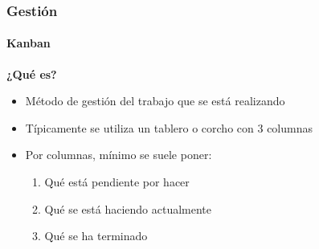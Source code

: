 \begin{frame}
	\frametitle{Gesti\'on}
	\framesubtitle{Kanban}
	
	\textbf{¿Qu\'e es?}
	\begin{itemize}
		\item M\'etodo de gesti\'on del trabajo que se est\'a realizando
		\item T\'ipicamente se utiliza un tablero o corcho con 3 columnas
		\item Por columnas, m\'inimo se suele poner:
		\begin{enumerate}
			\item Qu\'e est\'a pendiente por hacer
			\item Qu\'e se est\'a haciendo actualmente
			\item Qu\'e se ha terminado
		\end{enumerate}
		
	\end{itemize}
	
	
\end{frame}